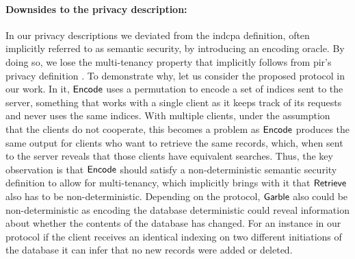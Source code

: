 \paragraph*{Downsides to the privacy description:} In our privacy descriptions we deviated from the \acrshort{indcpa} definition, often implicitly referred to as semantic security, by introducing an encoding oracle. By doing so, we lose the multi-tenancy property that implicitly follows from \acrshort{pir}'s privacy definition \cite{CCS:Henry17}. To demonstrate why, let us consider the proposed protocol in our work. In it, $ \mathsf{{Encode}} $ uses a permutation to encode a set of indices sent to the server, something that works with a single client as it keeps track of its requests and never uses the same indices. With multiple clients, under the assumption that the clients do not cooperate, this becomes a problem as $ \mathsf{{Encode}} $ produces the same output for clients who want to retrieve the same records, which, when sent to the server reveals that those clients have equivalent searches. Thus, the key observation is that $ \mathsf{{Encode}} $ should satisfy a non-deterministic semantic security definition to allow for multi-tenancy, which implicitly brings with it that $ \mathsf{{Retrieve}} $ also has to be non-deterministic. Depending on the protocol, $ \mathsf{{Garble}} $ also could be non-deterministic as encoding the database deterministic could reveal information about whether the contents of the database has changed. For an instance in our protocol if the client receives an identical indexing on two different initiations of the database it can infer that no new records were added or deleted.
